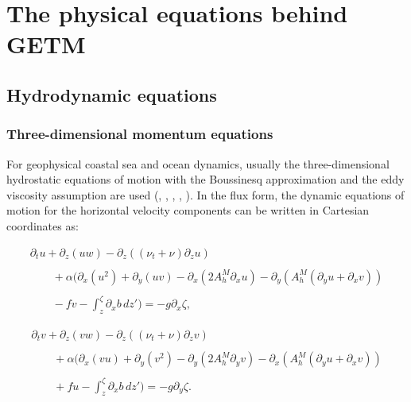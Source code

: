 
\section{The physical equations behind GETM}

\subsection{Hydrodynamic equations}

\subsubsection{Three-dimensional momentum equations}\label{Section_3d_momentum}

For geophysical coastal sea 
and ocean dynamics, usually the three-dimensional hydrostatic equations
of motion with the Boussinesq approximation and the eddy 
viscosity assumption are used (\cite{BRYAN69}, \cite{COX84},
\cite{BLUMBERGea87}, \cite{HAIDVOGELea99}, \cite{KANTHAea00b}). 
In the flux form, the dynamic equations of motion for
the horizontal velocity components can be written in Cartesian
coordinates as:


\begin{equation}\label{uEq}
\begin{array}{l}
\displaystyle
\partial_t u
+\partial_z(uw)
-\partial_z\left((\nu_t+\nu) \partial_z u\right)
\\ \\ \displaystyle
\qquad+\alpha\bigg(\partial_x(u^2)+\partial_y(uv)
-\partial_x\left(2A_h^M\partial_xu\right)-\partial_y\left(A_h^M
(\partial_yu+\partial_xv)\right)
\\ \\ \displaystyle
\qquad
-fv
-\int_z^{\zeta}\partial_x b\,dz' \bigg)
=
- g\partial_x \zeta,
\end{array}
\end{equation}

\begin{equation}\label{vEq}
\begin{array}{l}
\displaystyle
\partial_t v +\partial_z(vw)
-\partial_z\left((\nu_t+\nu) \partial_z v\right)
\\ \\
\displaystyle
\qquad+\alpha\bigg(\partial_x(vu)+\partial_y(v^2)
-\partial_y\left(2A_h^M\partial_yv\right)-\partial_x\left(A_h^M
(\partial_yu+\partial_xv)\right)
\\ \\
\displaystyle
\qquad
+fu
-\int_z^{\zeta}\partial_x b\,dz' \bigg)=
- g\partial_y \zeta.
\end{array}
\end{equation}

